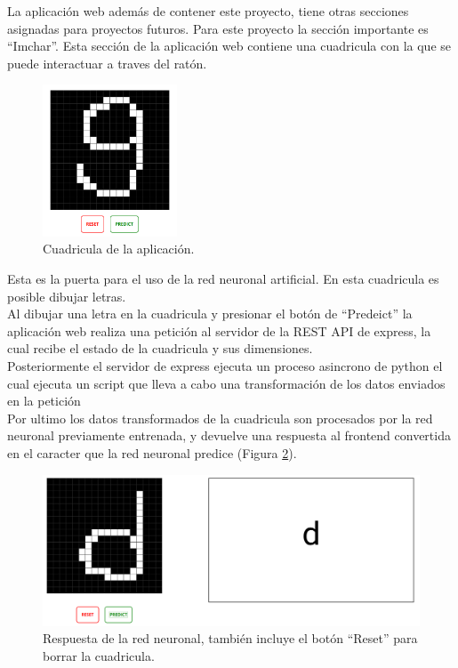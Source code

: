 \documentclass{article}
\begin{document}
La aplicación web además de contener este proyecto, tiene otras secciones asignadas para proyectos futuros. Para este proyecto la sección importante es ``Imchar''. 
Esta sección de la aplicación web contiene una cuadricula con la que se puede interactuar a traves del ratón. 
\begin{figure}[H]
    \centering
    \includegraphics[width=40mm]{grid2.png}
    \caption{Cuadricula de la aplicación.}
    \label{grid}
\end{figure}
Esta es la puerta para el uso de la red neuronal artificial. 
En esta cuadricula es posible dibujar letras.
\\ Al dibujar una letra en la cuadricula y presionar el botón de ``Predeict'' la aplicación web realiza una petición al servidor de la REST API de express,
la cual recibe el estado de la cuadricula y sus dimensiones. \\
Posteriormente el servidor de express ejecuta un proceso asincrono de python el cual ejecuta un script que lleva a cabo una transformación de los datos enviados en la petición  \\
Por ultimo los datos transformados de la cuadricula son procesados por la red neuronal previamente entrenada, y devuelve una respuesta al frontend convertida en el caracter que la red neuronal predice (Figura \ref{response}).
\begin{figure}[H]
    \centering
    \includegraphics[width=180mm]{response.png}
    \caption{Respuesta de la red neuronal, también incluye el botón ``Reset'' para borrar la cuadricula.}
    \label{response}
\end{figure}
\end{document}
